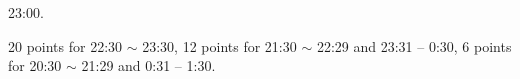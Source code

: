 23:00.

20 points for 22:30 $\sim$ 23:30, 12 points for 21:30 $\sim$ 22:29 and
23:31 -- 0:30, 6 points for 20:30 $\sim$ 21:29 and 0:31 -- 1:30.
